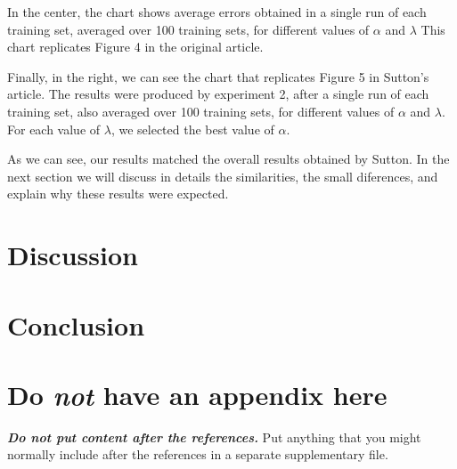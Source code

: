 \documentclass{article}
\begin{document}
    In the center, the chart shows average errors obtained in a single run of each training set, averaged over 100 training sets, for different values of $\alpha$ and $\lambda$
    This chart replicates Figure 4 in the original article.

    Finally, in the right, we can see the chart that replicates Figure 5 in Sutton's article.
    The results were produced by experiment 2, after a single run of each training set, also averaged over 100 training sets, for different values of $\alpha$ and $\lambda$.
    For each value of $\lambda$, we selected the best value of $\alpha$.

    As we can see, our results matched the overall results obtained by Sutton.
    In the next section we will discuss in details the similarities, the small diferences, and explain why these results were expected.


    \section{Discussion}
    \label{sec:discussion}
    \lipsum[2]
    \lipsum[3]

    \lipsum[2]
    \lipsum[3]


    \section{Conclusion}
    \label{sec:conclusion}
    \lipsum[2]
    \lipsum[3]


    \nocite{langley00}

    
    


    \appendix
    \section{Do \emph{not} have an appendix here}

    \textbf{\emph{Do not put content after the references.}}
    Put anything that you might normally include after the references in a separate
    supplementary file.
\end{document}
